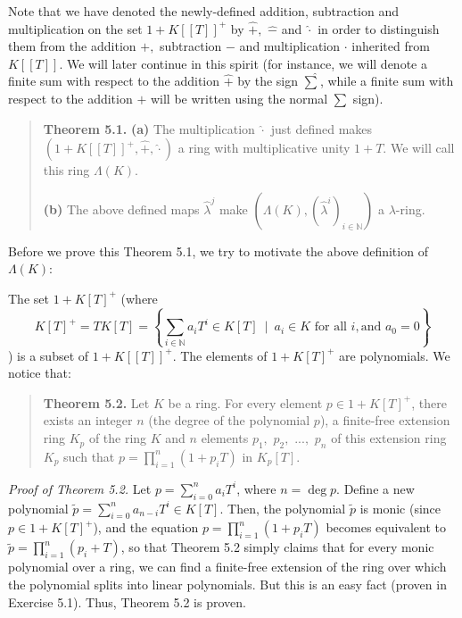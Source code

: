 \documentclass[12pt,final,notitlepage,onecolumn,german]{article}%
\begin{document}
Note that we have denoted the newly-defined addition, subtraction and
multiplication on the set $1+K\left[  \left[  T\right]  \right]  ^{+}$ by
$\widehat{+},$ $\widehat{-}$ and $\widehat{\cdot}$ in order to distinguish
them from the addition $+,$ subtraction $-$ and multiplication $\cdot$
inherited from $K\left[  \left[  T\right]  \right]  $. We will later continue
in this spirit (for instance, we will denote a finite sum with respect to the
addition $\widehat{+}$ by the sign $\widehat{\sum}$, while a finite sum with
respect to the addition $+$ will be written using the normal $\sum$ sign).

\begin{quote}
\textbf{Theorem 5.1.} \textbf{(a)} The multiplication $\widehat{\cdot}$ just
defined makes $\left(  1+K\left[  \left[  T\right]  \right]  ^{+},\widehat
{+},\widehat{\cdot}\right)  $ a ring with multiplicative unity $1+T$. We will
call this ring $\Lambda\left(  K\right)  $.

\textbf{(b)} The above defined maps $\widehat{\lambda}^{j}$ make $\left(
\Lambda\left(  K\right)  ,\left(  \widehat{\lambda}^{i}\right)  _{i\in
\mathbb{N}}\right)  $ a $\lambda$-ring.
\end{quote}

Before we prove this Theorem 5.1, we try to motivate the above definition of
$\Lambda\left(  K\right)  $:

The set $1+K\left[  T\right]  ^{+}$ (where%
\[
K\left[  T\right]  ^{+}=TK\left[  T\right]  =\left\{  \sum_{i\in\mathbb{N}%
}a_{i}T^{i}\in K\left[  T\right]  \ \mid\ a_{i}\in K\text{ for all }i,\text{
and }a_{0}=0\right\}
\]
) is a subset of $1+K\left[  \left[  T\right]  \right]  ^{+}.$ The elements of
$1+K\left[  T\right]  ^{+}$ are polynomials. We notice that:

\begin{quote}
\textbf{Theorem 5.2.} Let $K$ be a ring. For every element $p\in1+K\left[
T\right]  ^{+}$, there exists an integer $n$ (the degree of the polynomial
$p$), a finite-free extension ring $K_{p}$ of the ring $K$ and $n$ elements
$p_{1},$ $p_{2},$ $...,$ $p_{n}$ of this extension ring $K_{p}$ such that
$p=\prod\limits_{i=1}^{n}\left(  1+p_{i}T\right)  $ in $K_{p}\left[  T\right]
$.
\end{quote}

\textit{Proof of Theorem 5.2.} Let $p=\sum\limits_{i=0}^{n}a_{i}T^{i}$, where
$n=\deg p$. Define a new polynomial $\widetilde{p}=\sum\limits_{i=0}%
^{n}a_{n-i}T^{i}\in K\left[  T\right]  $. Then, the polynomial $\widetilde{p}$
is monic (since $p\in1+K\left[  T\right]  ^{+}$), and the equation
$p=\prod\limits_{i=1}^{n}\left(  1+p_{i}T\right)  $ becomes equivalent to
$\widetilde{p}=\prod\limits_{i=1}^{n}\left(  p_{i}+T\right)  $, so that
Theorem 5.2 simply claims that for every monic polynomial over a ring, we can
find a finite-free extension of the ring over which the polynomial splits into
linear polynomials. But this is an easy fact (proven in Exercise 5.1). Thus,
Theorem 5.2 is proven.
\end{document}
